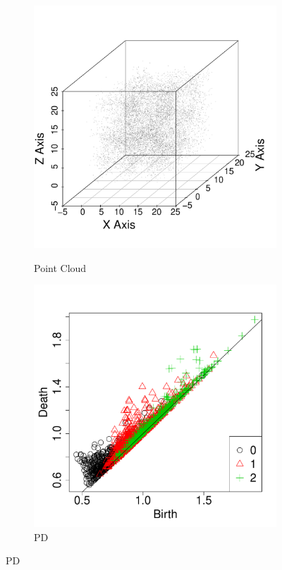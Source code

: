 \documentclass[12pt]{article}
\begin{document}
\begin{figure}[htbp]
   \centering
  \begin{subfigure}{.24\textwidth}
    \centering
        \caption{Point Cloud}
        \includegraphics[width=\linewidth]{figure_5_plot.pdf}
    \label{fig:examplestest1}
  \end{subfigure}
    \begin{subfigure}{.24\textwidth}
    \centering
        \caption{PD}
        \includegraphics[width=\linewidth]{figure_5_pd.pdf}

\end{subfigure}
\end{figure}
\end{document}

